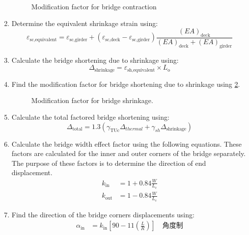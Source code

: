\begin{enumerate}
\begin{figure}
    \caption{Modification factor for bridge contraction}
    \label{fig:modification-factor-contraction}
  \end{figure}
  \item Determine the equivalent shrinkage strain using:
  \begin{equation}
    \varepsilon_\text{sc,equivalent} =\varepsilon_\text{sc,girder} + ( \varepsilon_\text{sc,deck} - \varepsilon_\text{sc,girder})\frac{(EA)_\text{deck}}{(EA)_\text{deck}+(EA)_\text{girder}} 
  \end{equation}
  \item Calculate the bridge shortening due to shrinkage using:
  \begin{equation}
    \Delta_\text{shrinkage} =\varepsilon_\text{sh,equivalent}\times L_\text{o}
  \end{equation}
  \item Find the modification factor for bridge shortening due to shrinkage using \cref{fig:modification-factor-shrinkage}.
  \begin{figure}
    \caption{Modification factor for bridge shrinkage.}
    \label{fig:modification-factor-shrinkage}
  \end{figure}
  \item\label{lst:cal-total-shortening} Calculate the total factored bridge shortening using:
  \begin{equation}
    \label{eq:total-shortening}
    \Delta_\text{total} =1.3 (\gamma_\text{TUc}\Delta_{thermal}+ \gamma_{sh}\Delta_\text{shrinkage})
  \end{equation}
  \item Calculate the bridge width effect factor using the following equations. These factors are calculated for the inner and outer corners of the bridge separately. The purpose of these factors is to determine the direction of end displacement.
  \begin{align}
    k_\text{in}  &= 1 + 0.84\frac{W}{L_\text{c}}\\
    k_\text{out} &= 1 - 0.84\frac{W}{L_\text{c}}
  \end{align}
  \item\label{lst:find-direction} Find the direction of the bridge corners displacements using:
  \begin{align}
    \alpha_\text{in}  &= k_\text{in}  \left[ 90- 11 \left(\frac{L}{R}\right)\right] \quad \text{角度制}\\

\end{align}
\end{enumerate}

